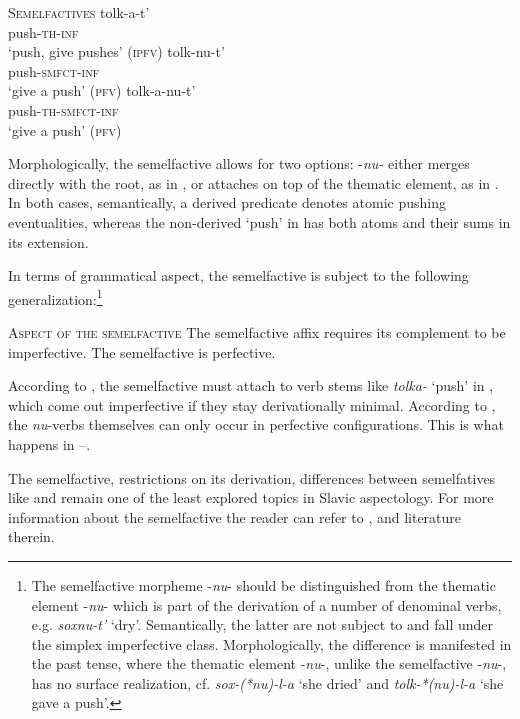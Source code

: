 \documentclass[output=paper,colorlinks,citecolor=brown]{langscibook}
\begin{document}
\ea   \textsc{Semelfactives}\label{tat:ex:9}
\ea \gll tolk-a-t’ \\
push-\textsc{th-inf}\\
\glt `push, give pushes' (\textsc{ipfv})\label{ex:tatevosov:9a}
\ex  \gll tolk-nu-t’ \\
push-\textsc{smfct-inf}\\
\glt  `give a push' (\textsc{pfv})  \label{ex:tatevosov:9b}
\ex tolk-a-nu-t’ \\
push-\textsc{th-smfct-inf}\\
\glt  `give a push' (\textsc{pfv})  \label{ex:tatevosov:9c}
\z
\z 

\noindent Morphologically, the semelfactive allows for two options: -\textit{nu-} either merges directly with the root, as in , or attaches on top of the thematic element, as in . In both cases, semantically, a derived predicate denotes atomic pushing eventualities, whereas the non-derived ‘push’ in  has both atoms and their sums in its extension.

In terms of grammatical aspect, the semelfactive is subject to the following generalization:\footnote{The semelfactive morpheme -\textit{nu}- should be distinguished from the thematic element -\textit{nu}- which is part of the derivation of a number of denominal verbs, e.g. \textit{soxnu-t’} ‘dry’. Semantically, the latter are not subject to  and fall under the simplex imperfective class. Morphologically, the difference is manifested in the past tense, where the thematic element -\textit{nu}-, unlike the semelfactive -\textit{nu}-, has no surface realization, cf. \textit{sox-(*nu)-l-a} ‘she dried’ and \textit{tolk-*(nu)-l-a} ‘she gave a push’.}  

\ea   \textsc{Aspect of the semelfactive}\label{tat:ex:10}
\ea The semelfactive affix requires its complement to be imperfective.\label{ex:tatevosov:10a}
\ex The semelfactive is perfective.\label{ex:tatevosov:10b}
\z\z

\noindent According to , the semelfactive must attach to verb stems like \textit{tolka-} ‘push’ in , which come out imperfective if they stay derivationally minimal. According to , the \textit{nu}-verbs themselves can only occur in perfective configurations. This is what happens in --.

The semelfactive, restrictions on its derivation, differences between semelfatives like  and  remain one of the least explored topics in Slavic aspectology. For more information about the semelfactive the reader can refer to \citet{Markman2008,Janda.Makarova2009,Gribanova2013,TaraldsenMedova.Wiland2019,Matushansky2024}, and literature therein.
\end{document}

